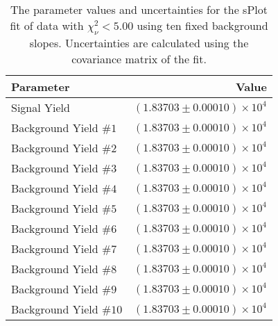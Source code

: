 
\begin{table}[ht]
    \begin{center}
        \begin{tabular}{lr}\toprule
            Parameter & Value \\\midrule
            Signal Yield & $(1.83703 \pm 0.00010) \times 10^{4}$ \\
            Background Yield $\#1$ & $(1.83703 \pm 0.00010) \times 10^{4}$ \\
            Background Yield $\#2$ & $(1.83703 \pm 0.00010) \times 10^{4}$ \\
            Background Yield $\#3$ & $(1.83703 \pm 0.00010) \times 10^{4}$ \\
            Background Yield $\#4$ & $(1.83703 \pm 0.00010) \times 10^{4}$ \\
            Background Yield $\#5$ & $(1.83703 \pm 0.00010) \times 10^{4}$ \\
            Background Yield $\#6$ & $(1.83703 \pm 0.00010) \times 10^{4}$ \\
            Background Yield $\#7$ & $(1.83703 \pm 0.00010) \times 10^{4}$ \\
            Background Yield $\#8$ & $(1.83703 \pm 0.00010) \times 10^{4}$ \\
            Background Yield $\#9$ & $(1.83703 \pm 0.00010) \times 10^{4}$ \\
            Background Yield $\#10$ & $(1.83703 \pm 0.00010) \times 10^{4}$ \\\bottomrule
        \end{tabular}
        \caption{The parameter values and uncertainties for the sPlot fit of data with $\chi^2_\nu < 5.00$ using ten fixed background slopes. Uncertainties are calculated using the covariance matrix of the fit.}\label{tab:splot-fit-results-chisqdof-5.00-fixed-10}
    \end{center}
\end{table}
